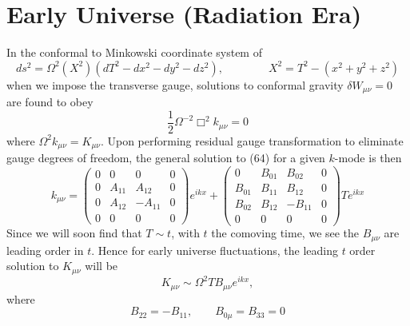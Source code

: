 \documentclass[10pt,letterpaper]{article}
\begin{document}
\section*{Early Universe (Radiation Era)}
In the conformal to Minkowski coordinate system of
\begin{equation}
ds^2 = \Omega^2(X^2)( dT^2 - dx^2 - dy^2 - dz^2),\qquad\qquad X^2 = T^2-(x^2+y^2+z^2)
\end{equation}
when we impose the transverse gauge,
solutions to conformal gravity $\delta W_{\mu\nu} = 0$ are found to obey
\begin{equation}
\frac{1}{2}\Omega^{-2}\Box^2 k_{\mu\nu} = 0
\end{equation}
where $\Omega^2 k_{\mu\nu} = K_{\mu\nu}$. Upon performing residual gauge transformation to eliminate gauge degrees of freedom, the general solution to (64) for a given $k$-mode is then
\begin{equation}
k_{\mu\nu} = 
 \begin{pmatrix}0&0&0&0\\0&A_{11}&A_{12}&0\\0&A_{12}&-A_{11}&0\\0&0&0&0\end{pmatrix}e^{ikx} + \begin{pmatrix}
0&B_{01}&B_{02}&0\\B_{01}&B_{11}&B_{12}&0\\B_{02}&B_{12}&-B_{11}&0\\0&0&0&0  \end{pmatrix}T e^{ikx} 
\end{equation}
Since we will soon find that $T \sim t$, with $t$ the comoving time, we see the $B_{\mu\nu}$ are leading order in $t$. Hence for early universe fluctuations, the leading $t$ order solution to $K_{\mu\nu}$ will be
\begin{equation}
K_{\mu\nu} \sim \Omega^2 TB_{\mu\nu}e^{ikx},
\end{equation}
where 
\begin{equation}
B_{22}= -B_{11},\qquad B_{0\mu} = B_{33} = 0
\end{equation}
\end{document}
